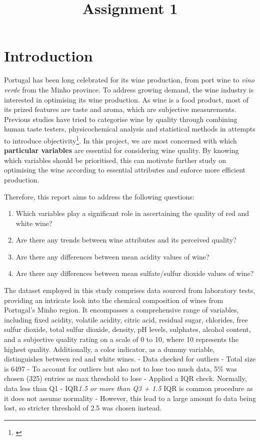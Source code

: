 \documentclass[
]{article}
\title{Assignment 1}
\author{}
\date{\vspace{-2.5em}}
\providecommand{\tightlist}{%
  \setlength{\itemsep}{0pt}\setlength{\parskip}{0pt}}
\begin{document}
\maketitle

\section{Introduction}\label{introduction}

Portugal has been long celebrated for its wine production, from port
wine to \emph{vino verde} from the Minho province. To address growing
demand, the wine industry is interested in optimising its wine
production. As wine is a food product, most of its prized features are
taste and aroma, which are subjective measurements. Previous studies
have tried to categorise wine by quality through combining human taste
testers, physicochemical analysis and statistical methods in attempts to
introduce objectivity\footnote{\textcite{RN1}}. In this project, we are
most concerned with which \textbf{particular variables} are essential
for considering wine quality. By knowing which variables should be
prioritised, this can motivate further study on optimising the wine
according to essential attributes and enforce more efficient production.

Therefore, this report aims to address the following questions:

\begin{enumerate}
\def\labelenumi{\arabic{enumi}.}
\tightlist
\item
  Which variables play a significant role in ascertaining the quality of
  red and white wine?
\item
  Are there any trends between wine attributes and its perceived
  quality?
\item
  Are there any differences between mean acidity values of wine?
\item
  Are there any differences between mean sulfate/sulfur dioxide values
  of wine?
\end{enumerate}

The dataset employed in this study comprises data sourced from
laboratory tests, providing an intricate look into the chemical
composition of wines from Portugal's Minho region. It encompasses a
comprehensive range of variables, including fixed acidity, volatile
acidity, citric acid, residual sugar, chlorides, free sulfur dioxide,
total sulfur dioxide, density, pH levels, sulphates, alcohol content,
and a subjective quality rating on a scale of 0 to 10, where 10
represents the highest quality. Additionally, a color indicator, as a
dummy variable, distinguishes between red and white wines. - Data
checked for outliers - Total size is 6497 - To account for outliers but
also not to lose too much data, 5\% was chosen (325) entries as max
threshold to lose - Applied a IQR check. Normally, data less than Q1 -
IQR\emph{1.5 or more than Q3 + 1.5 }IQR is common procedure as it does
not assume normality - However, this lead to a large amount fo data
being lost, so stricter threshold of 2.5 was chosen instead.
\end{document}
